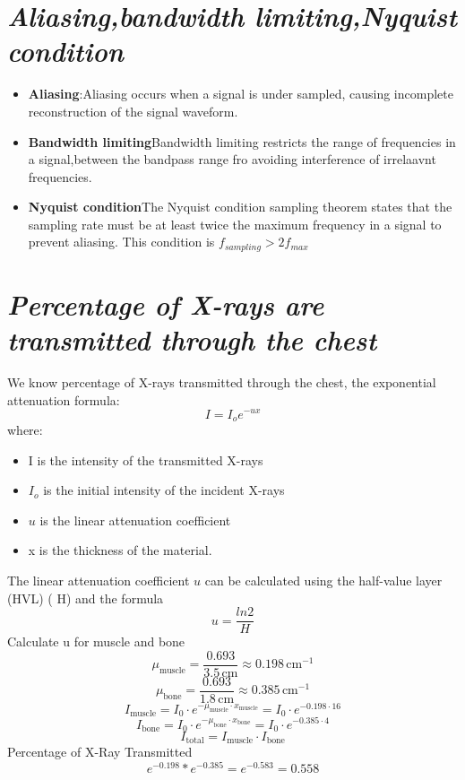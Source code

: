 \documentclass{article}
\begin{document}
\section{\textit{Aliasing,bandwidth limiting,Nyquist condition}}
\begin{itemize}
    \item \textbf{Aliasing}:Aliasing occurs when a signal is under sampled, causing incomplete reconstruction of the signal waveform.
    \item \textbf{Bandwidth limiting}Bandwidth limiting restricts the range of frequencies in a signal,between the bandpass range fro avoiding interference of irrelaavnt frequencies.
    \item \textbf{Nyquist condition}The Nyquist condition sampling theorem states  that the sampling rate must be at least twice the maximum frequency in a signal to prevent aliasing. This condition is   $f_{sampling}>2f_{max}$
\end{itemize}
\section{\textit{Percentage of X-rays are transmitted through the chest}}
We know percentage of X-rays transmitted through the chest,  the exponential attenuation formula:
\begin{equation}
    I=I_oe^{-ux}
\end{equation}
where:
\begin{itemize}
    \item I is the intensity of the transmitted X-rays
     \item $I_o$ is the initial intensity of the incident X-rays
     \item $u$ is the linear attenuation coefficient
     \item x is the thickness of the material.
\end{itemize}
The linear attenuation coefficient $u$ can be calculated using the half-value layer (HVL) (
H) and the formula 
\begin{equation}
    u=\frac{ln2}{H}
\end{equation}
Calculate u for muscle and bone
\[ \mu_{\text{muscle}} = \frac{0.693}{3.5 \, \text{cm}} \approx 0.198 \, \text{cm}^{-1} \]
\[ \mu_{\text{bone}} = \frac{0.693}{1.8 \, \text{cm}} \approx 0.385 \, \text{cm}^{-1} \]
\[ I_{\text{muscle}} = I_0 \cdot e^{-\mu_{\text{muscle}} \cdot x_{\text{muscle}}} = I_0 \cdot e^{-0.198 \cdot 16} \]
\[ I_{\text{bone}} = I_0 \cdot e^{-\mu_{\text{bone}} \cdot x_{\text{bone}}} = I_0 \cdot e^{-0.385 \cdot 4} \]
\[ I_{\text{total}} = I_{\text{muscle}} \cdot I_{\text{bone}} \]
Percentage of X-Ray Transmitted
$$e^{-0.198}*e^{-0.385}=e^{-0.583}=0.558$$
\end{document}
